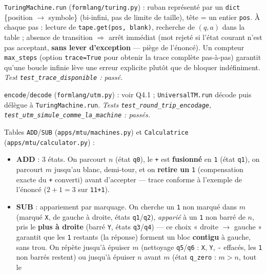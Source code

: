 \documentclass[11pt,a4paper]{scrartcl}
\begin{document}
\begin{description}[leftmargin=1.6em,style=nextline]
  \item[E4.1] \texttt{TuringMachine.run} (\texttt{formlang/turing.py}) : ruban
    représenté par un \texttt{dict} \{position $\to$ symbole\} (bi-infini, pas de
    limite de taille), tête = un entier \texttt{pos}. À chaque pas : lecture de
    \texttt{tape.get(pos, blank)}, recherche de $(q,a)$ dans la table ; absence de
    transition $\Rightarrow$ arrêt immédiat (mot rejeté si l'état courant n'est
    pas acceptant, \textbf{sans lever d'exception} — piège de l'énoncé). Un
    compteur \texttt{max\_steps} (option \texttt{trace=True} pour obtenir la trace
    complète pas-à-pas) garantit qu'une boucle infinie lève une erreur explicite
    plutôt que de bloquer indéfiniment. \emph{Test \texttt{test\_trace\_disponible} : passé.}
  \item[E4.2] \texttt{encode}/\texttt{decode} (\texttt{formlang/utm.py}) : voir
    Q4.1 ; \texttt{UniversalTM.run} décode puis délègue à
    \texttt{TuringMachine.run}. \emph{Tests \texttt{test\_round\_trip\_encodage},
    \texttt{test\_utm\_simule\_comme\_la\_machine} : passés.}
  \item[E4.3] Tables \texttt{ADD}/\texttt{SUB} (\texttt{apps/mtu/machines.py}) et
    \texttt{Calculatrice} (\texttt{apps/mtu/calculator.py}) :
    \begin{itemize}
      \item \textbf{ADD} : 3 états. On parcourt $n$ (état \texttt{q0}), le
        \texttt{+} est \textbf{fusionné} en \texttt{1} (état \texttt{q1}), on
        parcourt $m$ jusqu'au blanc, demi-tour, et on \textbf{retire un} \texttt{1}
        (compensation exacte du \texttt{+} converti) avant d'accepter — trace
        conforme à l'exemple de l'énoncé ($2+1=3$ sur \texttt{11+1}).
      \item \textbf{SUB} : appariement par marquage. On cherche un \texttt{1} non
        marqué dans $m$ (marqué \texttt{X}, de gauche à droite, états
        \texttt{q1}/\texttt{q2}), \emph{apparié} à un \texttt{1} non barré de $n$,
        pris le \textbf{plus à droite} (barré \texttt{Y}, états \texttt{q3}/\texttt{q4}) —
        ce choix « droite $\to$ gauche » garantit que les \texttt{1} restants (la
        réponse) forment un bloc \textbf{contigu} à gauche, sans trou. On répète
        jusqu'à épuiser $m$ (nettoyage \texttt{q5}/\texttt{q6} : \texttt{X},
        \texttt{Y}, \texttt{-} effacés, les \texttt{1} non barrés restent) ou
        jusqu'à épuiser $n$ avant $m$ (état \texttt{q\_zero} : $m>n$, tout le

\end{itemize}
\end{description}
\end{document}

